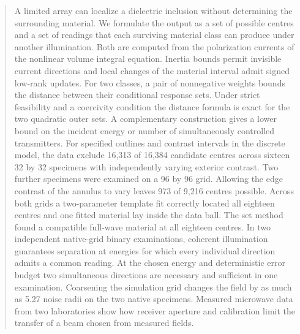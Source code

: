 \begin{abstract}
A limited array can localize a dielectric inclusion without determining the surrounding material. We formulate the output as a set of possible centres and a set of readings that each surviving material class can produce under another illumination. Both are computed from the polarization currents of the nonlinear volume integral equation. Inertia bounds permit invisible current directions and local changes of the material interval admit signed low-rank updates. For two classes, a pair of nonnegative weights bounds the distance between their conditional response sets. Under strict feasibility and a coercivity condition the distance formula is exact for the two quadratic outer sets. A complementary construction gives a lower bound on the incident energy or number of simultaneously controlled transmitters. For specified outlines and contrast intervals in the discrete model, the data exclude 16,313 of 16,384 candidate centres across sixteen 32 by 32 specimens with independently varying exterior contrast. Two further specimens were examined on a 96 by 96 grid. Allowing the edge contrast of the annulus to vary leaves 973 of 9,216 centres possible. Across both grids a two-parameter template fit correctly located all eighteen centres and one fitted material lay inside the data ball. The set method found a compatible full-wave material at all eighteen centres. In two independent native-grid binary examinations, coherent illumination guarantees separation at energies for which every individual direction admits a common reading. At the chosen energy and deterministic error budget two simultaneous directions are necessary and sufficient in one examination. Coarsening the simulation grid changes the field by as much as 5.27 noise radii on the two native specimens. Measured microwave data from two laboratories show how receiver aperture and calibration limit the transfer of a beam chosen from measured fields.
\end{abstract}
